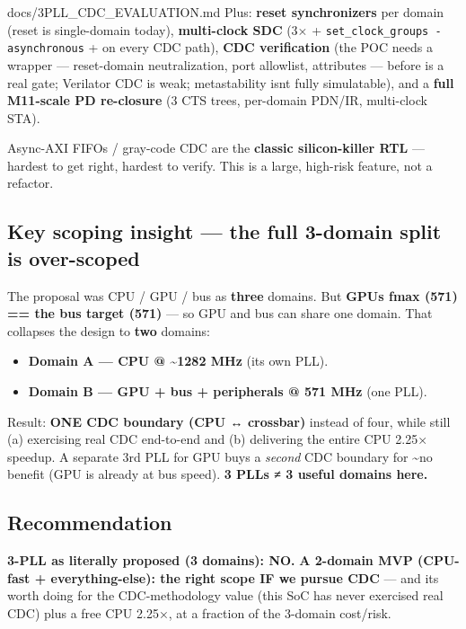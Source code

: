 \begin{relocated}{docs/3PLL_CDC_EVALUATION.md}
Plus: \textbf{reset synchronizers} per domain (reset is single-domain
today), \textbf{multi-clock SDC} (3×  +
\texttt{set\_\allowbreak{}clock\_\allowbreak{}groups\ -\allowbreak{}asynchronous}
+  on every CDC path), \textbf{CDC verification} (the
 POC needs a wrapper --- reset-domain neutralization,
port allowlist,  attributes --- before  is a
real gate; Verilator CDC is weak; metastability isn\textquotesingle t
fully simulatable), and a \textbf{full M11-scale PD re-closure} (3 CTS
trees, per-domain PDN/IR, multi-clock STA).

Async-AXI FIFOs / gray-code CDC are the \textbf{classic silicon-killer
RTL} --- hardest to get right, hardest to verify. This is a large,
high-risk feature, not a refactor.

\subsection{Key scoping insight --- the full 3-domain split is
over-scoped}\label{tm:dec:3pll-cdc:4-key-scoping-insight-the-full-3-domain-split-is-over-scoped}

The proposal was CPU / GPU / bus as \textbf{three} domains. But
\textbf{GPU\textquotesingle s fmax (571) == the bus target (571)} --- so
GPU and bus can share one domain. That collapses the design to
\textbf{two} domains:

\begin{itemize}
\tightlist
\item
  \textbf{Domain A --- CPU @ \textasciitilde1282 MHz} (its own PLL).
\item
  \textbf{Domain B --- GPU + bus + peripherals @ 571 MHz} (one PLL).
\end{itemize}

Result: \textbf{ONE CDC boundary (CPU ↔ crossbar)} instead of four,
while still (a) exercising real CDC end-to-end and (b) delivering the
entire CPU 2.25× speedup. A separate 3rd PLL for GPU buys a
\emph{second} CDC boundary for \textasciitilde no benefit (GPU is
already at bus speed). \textbf{3 PLLs ≠ 3 useful domains here.}

\subsection{Recommendation}\label{tm:dec:3pll-cdc:5-recommendation}

\textbf{3-PLL as literally proposed (3 domains): NO.} \textbf{A 2-domain
MVP (CPU-fast + everything-else): the right scope IF we pursue CDC} ---
and it\textquotesingle s worth doing for the CDC-methodology value (this
SoC has never exercised real CDC) plus a free CPU 2.25×, at a fraction
of the 3-domain cost/\allowbreak{}risk.


\end{relocated}
